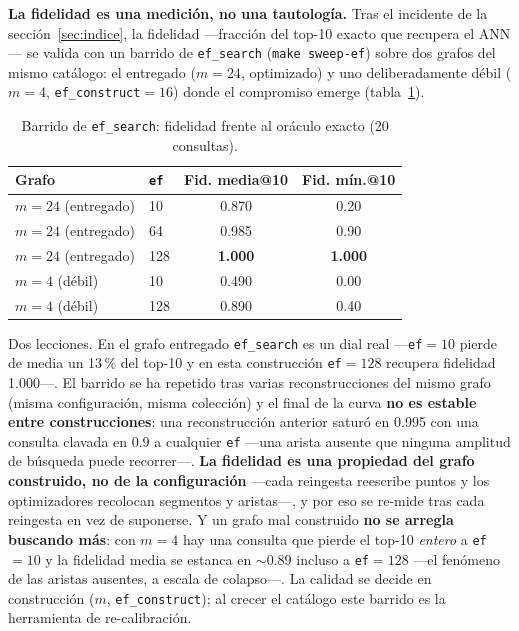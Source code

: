 \documentclass[10pt,twocolumn]{article}
\newcommand{\code}[1]{\texttt{\small #1}}
\begin{document}
\textbf{La fidelidad es una medición, no una tautología.} Tras el incidente
de la sección~\ref{sec:indice}, la fidelidad ---fracción del top-10 exacto
que recupera el ANN--- se valida con un barrido de \code{ef\_search}
(\code{make sweep-ef}) sobre dos grafos del mismo catálogo: el entregado
($m{=}24$, optimizado) y uno deliberadamente débil ($m{=}4$,
\code{ef\_construct}${=}16$) donde el compromiso emerge
(tabla~\ref{tab:barrido}).

\begin{table}[h]
  \centering\small
  \caption{Barrido de \code{ef\_search}: fidelidad frente al oráculo exacto
  (20 consultas).}
  \label{tab:barrido}
  \begin{tabular}{@{}llcc@{}}
    \toprule
    Grafo & \code{ef} & Fid. media@10 & Fid. mín.@10 \\
    \midrule
    $m{=}24$ (entregado) & 10 & 0.870 & 0.20 \\
    $m{=}24$ (entregado) & 64 & 0.985 & 0.90 \\
    $m{=}24$ (entregado) & 128 & \textbf{1.000} & \textbf{1.000} \\
    $m{=}4$ (débil) & 10 & 0.490 & 0.00 \\
    $m{=}4$ (débil) & 128 & 0.890 & 0.40 \\
    \bottomrule
  \end{tabular}
\end{table}

Dos lecciones. En el grafo entregado \code{ef\_search} es un dial real
---\code{ef}${=}10$ pierde de media un 13\,\% del top-10 y en esta
construcción \code{ef}${=}128$ recupera fidelidad 1.000---. El barrido se
ha repetido tras varias reconstrucciones del mismo grafo (misma
configuración, misma colección) y el final de la curva \textbf{no es
estable entre construcciones}: una reconstrucción anterior saturó en 0.995
con una consulta clavada en 0.9 a cualquier \code{ef} ---una arista
ausente que ninguna amplitud de búsqueda puede recorrer---. \textbf{La
fidelidad es una propiedad del grafo construido, no de la configuración}
---cada reingesta reescribe puntos y los optimizadores recolocan segmentos
y aristas---, y por eso se re-mide tras cada reingesta en vez de
suponerse. Y un grafo mal construido \textbf{no se arregla buscando más}:
con $m{=}4$ hay una consulta que pierde el top-10 \emph{entero} a
\code{ef}${=}10$ y la fidelidad media se estanca en ${\sim}0.89$ incluso a
\code{ef}${=}128$ ---el fenómeno de las aristas ausentes, a escala de
colapso---. La calidad se decide en construcción ($m$,
\code{ef\_construct}); al crecer el catálogo este barrido es la
herramienta de re-calibración.
\end{document}
